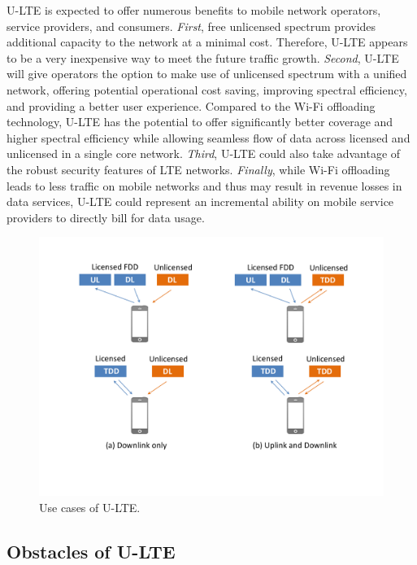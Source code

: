 \documentclass[journal,draftclsnofoot,12pt,onecolumn]{IEEEtran}
\begin{document}
\noindent U-LTE is expected to offer numerous benefits to mobile network operators, service providers, and consumers. \textit{First}, free unlicensed spectrum provides additional capacity to the network at a minimal cost. Therefore, U-LTE appears to be a very inexpensive way to meet the future traffic growth. \textit{Second}, U-LTE will give operators the option to make use of unlicensed spectrum with a unified network, offering potential operational cost saving, improving spectral efficiency, and providing a better user experience. Compared to the Wi-Fi offloading technology, U-LTE has the potential to offer significantly better coverage and higher spectral efficiency while allowing seamless flow of data across licensed and unlicensed in a single core network. \textit{Third}, U-LTE could also take advantage of the robust security features of LTE networks. \textit{Finally}, while Wi-Fi offloading leads to less traffic on mobile networks and thus may result in revenue losses in data services, U-LTE could represent an incremental ability on mobile service providers to directly bill for data usage.

\begin{figure}[!t]
\centering
\includegraphics[width=0.7\columnwidth]{figures2/U-LTE-use_model}
\caption{Use cases of U-LTE.}
\label{figs:U-LTE-use_model}
\end{figure}

\subsection{Obstacles of U-LTE}
\end{document}
